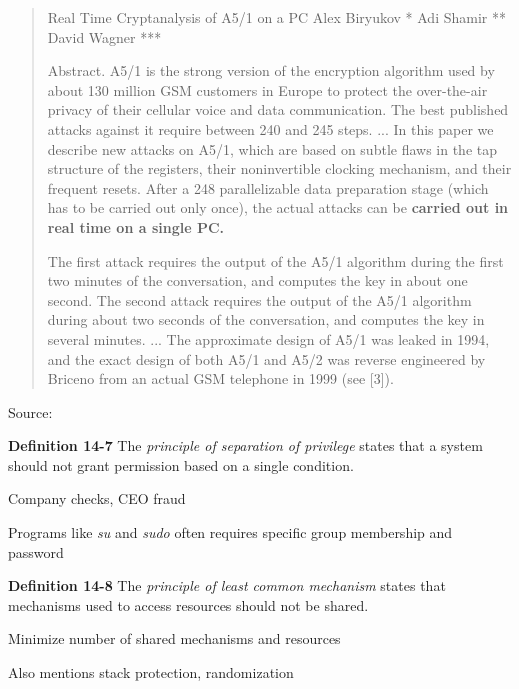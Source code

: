 \documentclass[Screen16to9,17pt]{foils}
\begin{document}

\begin{quote}
  Real Time Cryptanalysis of A5/1 on a PC
Alex Biryukov * Adi Shamir ** David Wagner ***

  Abstract. A5/1 is the strong version of the encryption algorithm used by about 130 million GSM customers in Europe to protect the over-the-air privacy of their cellular voice and data communication. The best published attacks against it require between 240 and 245 steps. ...
  In this paper we describe new attacks on A5/1, which are based on subtle flaws in the tap structure of the registers, their noninvertible clocking mechanism, and their frequent resets. After a 248 parallelizable data preparation stage (which has to be carried out only once), the actual attacks can be {\bf carried out in real time on a single PC.}

  The first attack requires the output of the A5/1 algorithm during the first two minutes of the conversation, and computes the key in about one second. The second attack requires the output of the A5/1 algorithm during about two seconds of the conversation, and computes the key in several minutes.
  ...
  The approximate design of A5/1 was leaked in 1994, and the exact design of both A5/1 and A5/2 was reverse engineered by Briceno from an actual GSM telephone in 1999 (see [3]).
\end{quote}
Source: 



\begin{list1}
\item {\bf Definition 14-7} The \emph{principle of separation of privilege} states that a system should not grant permission based on a single condition.
\item Company checks, CEO fraud
\item Programs like \emph{su} and \emph{sudo} often requires specific group membership and password
\end{list1}



\begin{list1}
\item {\bf Definition 14-8} The \emph{principle of least common mechanism} states that mechanisms used to access resources should not be shared.
\item Minimize number of shared mechanisms and resources
\item Also mentions stack protection, randomization
\end{list1}
\end{document}
